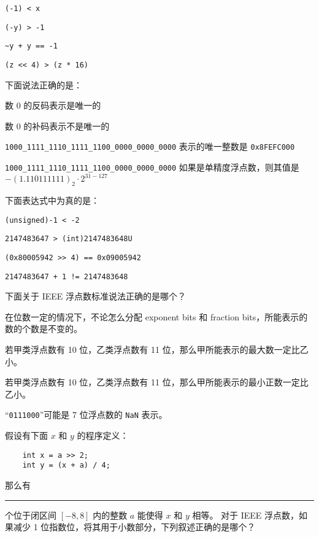\begin{problems}
		\begin{choices}
			\item \verb|(-1) < x|
			\item \verb|(-y) > -1|
			\item \verb|~y + y == -1|
			\item \verb|(z << 4) > (z * 16)|
		\end{choices}
		 下面说法正确的是：
		\begin{choices}
			\item 数 0 的反码表示是唯一的
			\item 数 0 的补码表示不是唯一的
			\item \verb|1000_1111_1110_1111_1100_0000_0000_0000| 表示的唯一整数是 \texttt{0x8FEFC000}
			\item \verb|1000_1111_1110_1111_1100_0000_0000_0000| 如果是单精度浮点数，则其值是 $-(1.110111111)_2 \cdot 2^{31-127}$
		\end{choices}
		 下面表达式中为真的是：
		\begin{choices}
			\item \verb|(unsigned)-1 < -2|
			\item \verb|2147483647 > (int)2147483648U|
			\item \verb|(0x80005942 >> 4) == 0x09005942|
			\item \verb|2147483647 + 1 != 2147483648|
		\end{choices}
         下面关于 IEEE 浮点数标准说法正确的是哪个？
		\begin{choices}
			\item 在位数一定的情况下，不论怎么分配 exponent bits 和 fraction bits，所能表示的数的个数是不变的。
			\item 若甲类浮点数有 10 位，乙类浮点数有 11 位，那么甲所能表示的最大数一定比乙小。
			\item 若甲类浮点数有 10 位，乙类浮点数有 11 位，那么甲所能表示的最小正数一定比乙小。
		    \item “\texttt{0111000}”可能是 7 位浮点数的 \texttt{NaN} 表示。
		\end{choices}
		 假设有下面 $x$ 和 $y$ 的程序定义：
		\begin{verbatim}
    int x = a >> 2;
    int y = (x + a) / 4;
		\end{verbatim}
		那么有 \rule{2.5cm}{0.25mm} 个位于闭区间 $[-8, 8]$ 内的整数 $a$ 能使得 $x$ 和 $y$ 相等。
         对于 IEEE 浮点数，如果减少 1 位指数位，将其用于小数部分，下列叙述正确的是哪个？
		\begin{choices}

\end{choices}
\end{problems}
